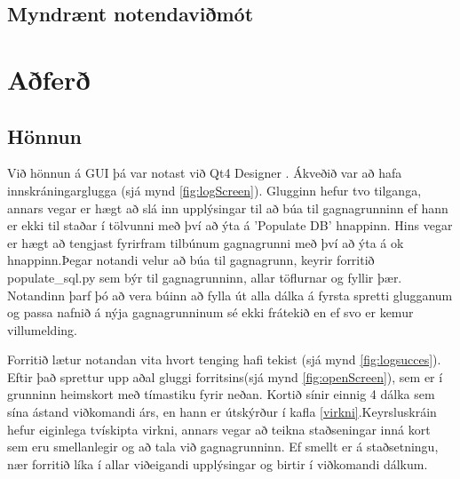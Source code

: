 \documentclass[12pt, git, final]{rureport}
\begin{document}
\subsection{Myndrænt notendaviðmót}



\section{Aðferð}
\subsection{Hönnun}
Við hönnun á GUI þá var notast við Qt4 Designer \cite{qt4}. Ákveðið var að hafa innskráningarglugga (sjá mynd \ref{fig:logScreen}). Glugginn hefur tvo tilganga, annars vegar er hægt að slá inn upplýsingar til að búa til gagnagrunninn ef hann er ekki til staðar í tölvunni með því að ýta á 'Populate DB' hnappinn. Hins vegar er hægt að tengjast fyrirfram tilbúnum gagnagrunni með því að ýta á ok hnappinn.Þegar notandi velur að búa til gagnagrunn, keyrir forritið populate\_sql.py sem býr til gagnagrunninn, allar töflurnar og fyllir þær. Notandinn þarf þó að vera búinn að fylla út alla dálka á fyrsta spretti glugganum og passa nafnið á nýja gagnagrunninum sé ekki frátekið en ef svo er kemur villumelding.

Forritið lætur notandan vita hvort tenging hafi tekist (sjá mynd \ref{fig:logsucces}). Eftir það sprettur upp aðal gluggi forritsins(sjá mynd \ref{fig:openScreen}), sem er í grunninn heimskort með tímastiku fyrir neðan. Kortið sínir einnig 4 dálka sem sína ástand viðkomandi árs, en hann er útskýrður  í kafla \ref{virkni}.Keyrsluskráin hefur eiginlega tvískipta virkni, annars vegar að teikna staðseningar inná kort sem eru smellanlegir og að tala við gagnagrunninn. Ef smellt er á staðsetningu, nær forritið líka í allar viðeigandi upplýsingar og birtir í viðkomandi dálkum.
 

\end{document}
